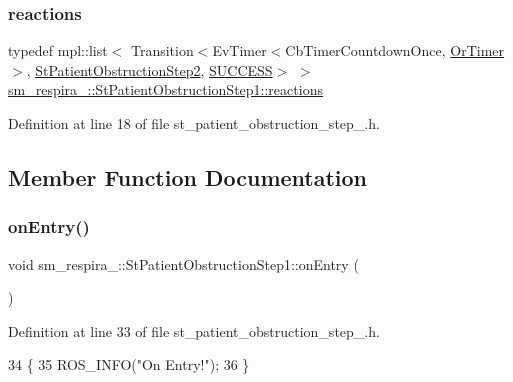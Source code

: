 \subsubsection{\texorpdfstring{reactions}{reactions}}
{\footnotesize\ttfamily typedef mpl\+::list$<$ Transition$<$Ev\+Timer$<$Cb\+Timer\+Countdown\+Once, \hyperlink{classsm__respira__1_1_1OrTimer}{Or\+Timer}$>$, \hyperlink{structsm__respira__1_1_1StPatientObstructionStep2}{St\+Patient\+Obstruction\+Step2}, \hyperlink{classSUCCESS}{S\+U\+C\+C\+E\+SS}$>$ $>$ \hyperlink{structsm__respira__1_1_1StPatientObstructionStep1_ad2c374ebfe1ef64492c0beb0b7d11fc1}{sm\+\_\+respira\+\_\+::\+St\+Patient\+Obstruction\+Step1\+::reactions}}



Definition at line 18 of file st\+\_\+patient\+\_\+obstruction\+\_\+step\+\_.\+h.



\subsection{Member Function Documentation}
\mbox{\label{structsm__respira__1_1_1StPatientObstructionStep1_abf880550f32fc9a0013f72862b08b585}} 
\subsubsection{\texorpdfstring{on\+Entry()}{onEntry()}}
{\footnotesize\ttfamily void sm\+\_\+respira\+\_\+::\+St\+Patient\+Obstruction\+Step1\+::on\+Entry (\begin{DoxyParamCaption}{ }\end{DoxyParamCaption})\hspace{0.3cm}{\ttfamily [inline]}}



Definition at line 33 of file st\+\_\+patient\+\_\+obstruction\+\_\+step\+\_.\+h.


\begin{DoxyCode}
34     \{
35         ROS\_INFO(\textcolor{stringliteral}{"On Entry!"});
36     \}
\end{DoxyCode}
\mbox{\label{structsm__respira__1_1_1StPatientObstructionStep1_a9db651db42809f269204c64762f3bad8}} 
